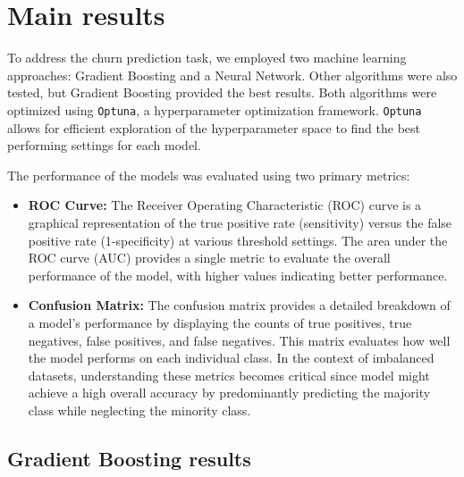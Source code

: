 \documentclass[12pt]{article}
\begin{document}
\section{Main results}
To address the churn prediction task, we employed two machine learning approaches: Gradient Boosting and a Neural Network. Other algorithms were also tested, but Gradient Boosting provided the best results. Both algorithms were optimized using \texttt{Optuna}, a hyperparameter optimization framework. \texttt{Optuna} allows for efficient exploration of the hyperparameter space to find the best performing settings for each model.

The performance of the models was evaluated using two primary metrics:
\begin{itemize}
    \item \textbf{ROC Curve:} The Receiver Operating Characteristic (ROC) curve is a graphical representation of the true positive rate (sensitivity) versus the false positive rate (1-specificity) at various threshold settings. The area under the ROC curve (AUC) provides a single metric to evaluate the overall performance of the model, with higher values indicating better performance.
    \item \textbf{Confusion Matrix:} The confusion matrix provides a detailed breakdown of a model's performance by displaying the counts of true positives, true negatives, false positives, and false negatives. This matrix evaluates how well the model performs on each individual class. In the context of imbalanced datasets, understanding these metrics becomes critical since model might achieve a high overall accuracy by predominantly predicting the majority class while neglecting the minority class. 
\end{itemize}

\subsection{Gradient Boosting results}
\end{document}
